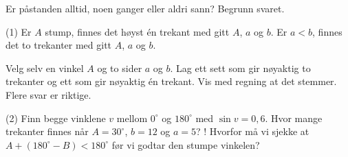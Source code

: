 Er påstanden alltid, noen ganger eller aldri sann? Begrunn svaret.
\begin{tasks}(1)
  \task Er $A$ stump, finnes det høyst én trekant med gitt $A$, $a$ og $b$.
  \task Er $a < b$, finnes det to trekanter med gitt $A$, $a$ og $b$.
\end{tasks}

Velg selv en vinkel $A$ og to sider $a$ og $b$.
Lag ett sett som gir nøyaktig to trekanter og ett som gir nøyaktig én trekant.
Vis med regning at det stemmer. Flere svar er riktige.

\begin{sjekk}
\begin{tasks}(2)
  \task Finn begge vinklene $v$ mellom $0^\circ$ og $180^\circ$ med $\sin v = 0,6$.
  \task Hvor mange trekanter finnes når $A = 30^\circ$, $b = 12$ og $a = 5$?
  \task! Hvorfor må vi sjekke at $A + (180^\circ - B) < 180^\circ$ før vi godtar den stumpe vinkelen?
\end{tasks}
\end{sjekk}
